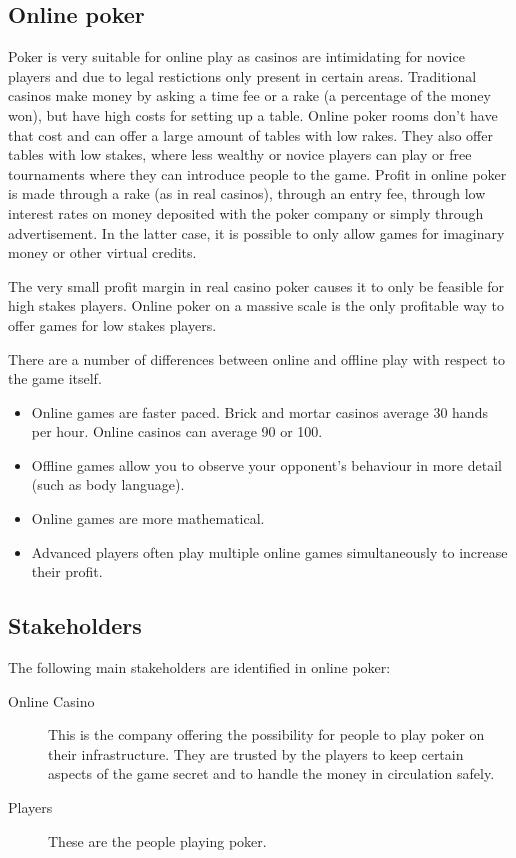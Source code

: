 \documentclass[a4paper,11pt]{report}
\begin{document}
\subsection{Online poker}
Poker is very suitable for online play as casinos are intimidating for novice players and due to legal restictions only present in certain areas. Traditional casinos make money by asking a time fee or a rake (a percentage of the money won), but have high costs for setting up a table. Online poker rooms don't have that cost and can offer a large amount of tables with low rakes. They also offer tables with low stakes, where less wealthy or novice players can play or free tournaments where they can introduce people to the game.
Profit in online poker is made through a rake (as in real casinos), through an entry fee, through low interest rates on money deposited with the poker company or simply through advertisement. In the latter case, it is possible to only allow games for imaginary money or other virtual credits. 

The very small profit margin in real casino poker causes it to only be feasible for high stakes players. Online poker on a massive scale is the only profitable way to offer games for low stakes players.

There are a number of differences between online and offline play with respect to the game itself.
\begin{itemize}
 \item Online games are faster paced. Brick and mortar casinos average 30 hands per hour. Online casinos can average 90 or 100.
 \item Offline games allow you to observe your opponent's behaviour in more detail (such as body language).
 \item Online games are more mathematical.
 \item Advanced players often play multiple online games simultaneously to increase their profit.
\end{itemize}

\subsection{Stakeholders}
The following main stakeholders are identified in online poker:
\begin{description}
 \item[Online Casino] This is the company offering the possibility for people to play poker on their infrastructure. They are trusted by the players to keep certain aspects of the game secret and to handle the money in circulation safely.
 \item[Players] These are the people playing poker.
 \end{description}
\end{document}
